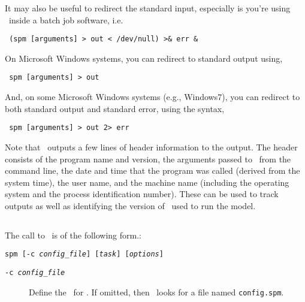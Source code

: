 It may also be useful to redirect the standard input, especially is you're using \SPM\ inside a batch job software, i.e. 

\begin{verbatim} (spm [arguments] > out < /dev/null) >& err &\end{verbatim}

On Microsoft Windows systems, you can redirect to standard output using,

\begin{verbatim} spm [arguments] > out\end{verbatim}

And, on some Microsoft Windows systems (e.g., Windows7), you can redirect to both standard output and standard error, using the syntax, 

\begin{verbatim} spm [arguments] > out 2> err\end{verbatim}

Note that \SPM\ outputs a few lines of header information to the output. The header consists of the program name and version, the arguments passed to \SPM\ from the command line, the date and time that the program was called (derived from the system time), the user name, and the machine name (including the operating system and the process identification number). These can be used to track outputs as well as identifying the version of \SPM\ used to run the model.

\subsection{\label{sec:command-line-arguments}}

The call to \SPM\ is of the following form.: 

\texttt{spm [-c \emph{config\_file}] [\emph{task}] [\emph{options}]}

\begin{description}
  \item [\texttt{-c \emph{config\_file}}] Define the \config\ for \SPM. If omitted, then \SPM\ looks for a file named \texttt{config.spm}.
\end{description}


